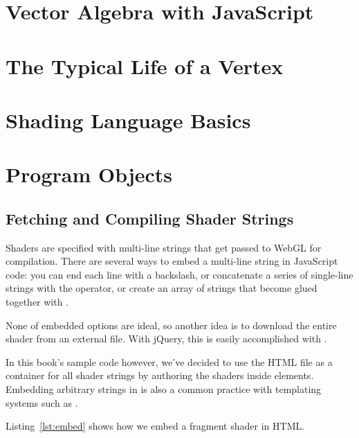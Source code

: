 \section{Vector Algebra with JavaScript}

\section{The Typical Life of a Vertex}

\section{Shading Language Basics}

\section{Program Objects}

\subsection{Fetching and Compiling Shader Strings}

Shaders are specified with multi-line strings that get passed to WebGL for compilation.  There are several ways to embed a multi-line string in JavaScript code: you can end each line with a backslash, or concatenate a series of single-line strings with the \code{+} operator, or create an array of strings that become glued together with .

None of embedded options are ideal, so another idea is to download the entire shader from an external file.  With jQuery, this is easily accomplished with .

In this book's sample code however, we've decided to use the HTML file as a container for all shader strings by authoring the shaders inside  elements.  Embedding arbitrary strings in  is also a common practice with templating systems such as \mbox{}.

Listing~\ref{lst:embed} shows how we embed a fragment shader in HTML.

